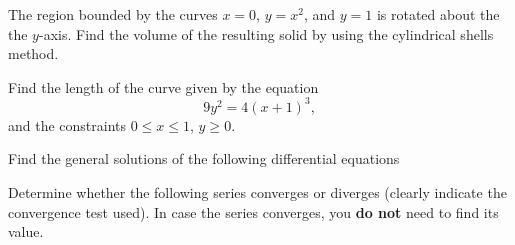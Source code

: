 \documentclass[11pt]{exam}
\begin{document}
\begin{questions}

\newpage
\addpoints
\question[3] The region bounded by the curves $x=0$, $y=x^2$,  and $y=1$ is rotated about the the $y$-axis. Find the volume of the resulting solid by using the cylindrical shells method.


\newpage
\addpoints
\question[3] Find the length of the curve given by the equation 
\begin{equation*}
9y^2=4(x+1)^3,
\end{equation*}
and the constraints $0 \leq x \leq 1$, $y \geq 0$. 

\newpage
\addpoints
\question Find the general solutions of the following differential equations
\newpage
\addpoints
\question Determine whether the following series converges or diverges (clearly indicate the convergence test used). In case the series converges, you \textbf{do not} need to find its value. 
\begin{parts}

\end{parts}
\end{questions}
\end{document}
